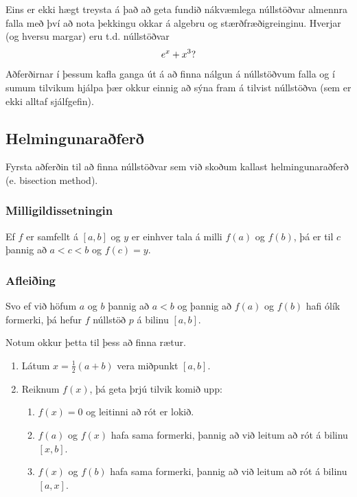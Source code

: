 \documentclass[a4paper,10pt,icelandic]{sphinxmanual}
\begin{document}
Eins er ekki hægt treysta á það að geta fundið nákvæmlega núllstöðvar almennra falla með því
að nota þekkingu okkar á algebru og stærðfræðigreinginu. Hverjar (og hversu margar) eru t.d. núllstöðvar
\begin{gather}
\begin{split}e^x + x^3?\end{split}\notag
\end{gather}
Aðferðirnar í þessum kafla ganga út á að finna nálgun á núllstöðvum falla og í sumum tilvikum
hjálpa þær okkur einnig að sýna fram á tilvist núllstöðva (sem er ekki alltaf sjálfgefin).


\subsection{Helmingunaraðferð}
\label{kafli02:helmingunarafer}
Fyrsta aðferðin til að finna núllstöðvar sem við skoðum kallast
helmingunaraðferð (e. bisection method).


\subsubsection{Milligildissetningin}
\label{kafli02:milligildissetningin}
Ef \(f\) er samfellt á \([a,b]\) og \(y\) er einhver
tala á milli \(f(a)\) og \(f(b)\), þá er til \(c\)
þannig að \(a < c < b\) og \(f(c) = y\).


\subsubsection{Afleiðing}
\label{kafli02:afleiing}
Svo ef við höfum \(a\) og \(b\) þannig að \(a < b\) og
þannig að \(f(a)\) og \(f(b)\) hafi ólík formerki, þá hefur
\(f\) núllstöð \(p\) á bilinu \([a,b]\).

Notum okkur þetta til þess að finna rætur.
\begin{enumerate}
\item {} 
Látum \(x = \frac 12(a+b)\) vera miðpunkt \([a,b]\).

\item {} 
Reiknum \(f(x)\), þá geta þrjú tilvik komið upp:
\begin{enumerate}
\item {} 
\(f(x) = 0\) og leitinni að rót er lokið.

\item {} 
\(f(a)\) og \(f(x)\) hafa sama formerki, þannig að við
leitum að rót á bilinu \([x,b]\).

\item {} 
\(f(x)\) og \(f(b)\) hafa sama formerki, þannig að við
leitum að rót á bilinu \([a,x]\).

\end{enumerate}

\end{enumerate}
\end{document}
